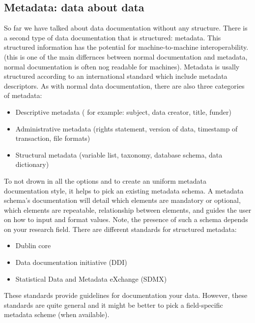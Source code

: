 \subsection{Metadata: data about data}
So far we have talked about data documentation without any structure. There is a second type of data documentation that is structured: metadata. This structured information has the potential for machine-to-machine interoperability. (this is one of the main differnces between normal documentation and metadata, normal documentation is often nog readable for machines).
\whiteline
Metadata is usally structured according to an international standard which include metadata descriptors. 
\whiteline
As with normal data documentation, there are also three categories of metadata:
\begin{itemize}
	\item Descriptive metadata ( for example: subject, data creator, title, funder)
	\item Administrative metadata (rights statement, version of data, timestamp of transaction, file formats)
	\item Structural metadata (variable list, taxonomy, database schema, data dictionary)
\end{itemize}
\whiteline
To not drown in all the options and to create an uniform metadata documentation style, it helps to pick an existing metadata schema. A metadata schema’s documentation will detail which elements are mandatory or optional, which elements are repeatable, relationship between elements, and guides the user on how to input and format values. Note, the presence of such a schema depends on your research field.
There are different standards for structured metadata:
\whiteline
\begin{itemize}
	\item Dublin core
	\item Data documentation initiative (DDI)
	\item Statistical Data and Metadata eXchange (SDMX)
\end{itemize}
\whiteline
These standards provide guidelines for documentation your data. However, these standards are quite general and it might be better to pick a field-specific metadata scheme (when available).


